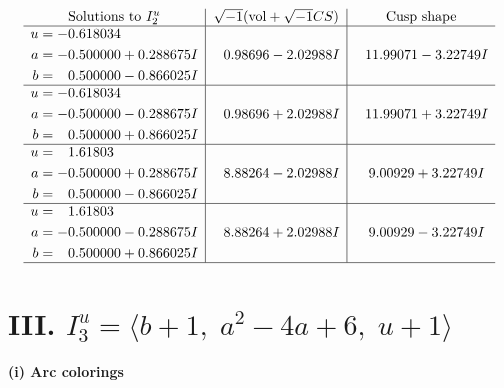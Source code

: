 \documentclass[1p]{elsarticle_modified}
\theoremstyle{definition}
\newcommand{\I}{\sqrt{-1}}
\begin{document}
$$\begin{array}{c|c|c}  
\text{Solutions to }I^u_{2}& \I (\text{vol} + \sqrt{-1}CS) & \text{Cusp shape}\\
 \hline 
\begin{aligned}
u &= -0.618034\phantom{ +0.000000I} \\
a &= -0.500000 + 0.288675 I \\
b &= \phantom{-}0.500000 - 0.866025 I\end{aligned}
 & \phantom{-}0.98696 - 2.02988 I & \phantom{-}11.99071 - 3.22749 I \\ \hline\begin{aligned}
u &= -0.618034\phantom{ +0.000000I} \\
a &= -0.500000 - 0.288675 I \\
b &= \phantom{-}0.500000 + 0.866025 I\end{aligned}
 & \phantom{-}0.98696 + 2.02988 I & \phantom{-}11.99071 + 3.22749 I \\ \hline\begin{aligned}
u &= \phantom{-}1.61803\phantom{ +0.000000I} \\
a &= -0.500000 + 0.288675 I \\
b &= \phantom{-}0.500000 - 0.866025 I\end{aligned}
 & \phantom{-}8.88264 - 2.02988 I & \phantom{-}9.00929 + 3.22749 I \\ \hline\begin{aligned}
u &= \phantom{-}1.61803\phantom{ +0.000000I} \\
a &= -0.500000 - 0.288675 I \\
b &= \phantom{-}0.500000 + 0.866025 I\end{aligned}
 & \phantom{-}8.88264 + 2.02988 I & \phantom{-}9.00929 - 3.22749 I\\
 \hline 
 \end{array}$$\newpage\newpage\renewcommand{\arraystretch}{1}
\centering \section*{III. $I^u_{3}= \langle b+1,\;a^2-4 a+6,\;u+1 \rangle$}
\flushleft \textbf{(i) Arc colorings}\\
\end{document}
